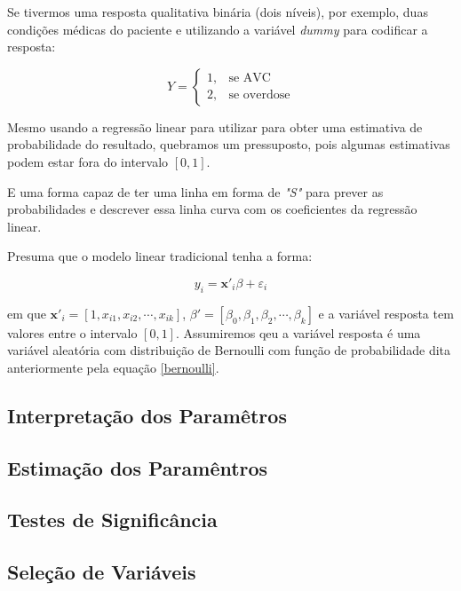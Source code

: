 \documentclass[
	12pt,				%
	openright,			%
	oneside,      %
	a4paper,			%
	english,			%
	french,				%
	spanish,			%
	brazil,				%
	]{abntex2}\usepackage[]{graphicx}\usepackage[]{xcolor}
\begin{document}
Se tivermos uma resposta qualitativa binária (dois níveis), por exemplo, duas condições
médicas do paciente e utilizando a variável \textit{dummy} para codificar a resposta:

$$
Y = \left\{
\begin{array}{rcl}
1, & \textrm{se AVC}\\
2, & \textrm{se overdose}
\end{array}
\right.
$$

Mesmo usando a regressão linear para utilizar para obter uma estimativa de probabilidade
do resultado, quebramos um pressuposto, pois algumas estimativas podem estar fora do
intervalo $[0,1]$.


E uma forma capaz de ter uma linha em forma de \textit{"S"} para prever as probabilidades 
e descrever essa linha curva com os coeficientes da regressão linear.

Presuma que o modelo linear tradicional tenha a forma: 

\begin{equation}
  y_{i} = \mathbf{x'}_i \beta + \varepsilon_i
\end{equation}

\noindent em que $\mathbf{x'}_i = [1,x_{i1},x_{i2},\cdots,x_{ik}]$, $\beta' = 
[\beta_0,\beta_1,\beta_2,\cdots,\beta_k]$ e a variável resposta tem valores entre
o intervalo $[0,1]$. Assumiremos qeu a variável resposta é uma variável aleatória 
com distribuição de Bernoulli com função de probabilidade dita anteriormente pela 
equação \ref{bernoulli}.


      \subsection{Interpretação dos Paramêtros}




      \subsection{Estimação dos Paramêntros}





      \subsection{Testes de Significância}





      \subsection{Seleção de Variáveis}
\end{document}

